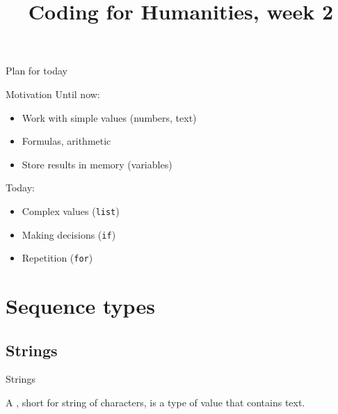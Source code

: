 \documentclass[aspectratio=169,usenames,dvipsnames]{beamer}
\title{Coding for Humanities, week 2}
\begin{document}
\begin{frame}
    \titlepage
\end{frame}

\begin{frame}{Plan for today}
    \tableofcontents
\end{frame}

\begin{frame}{Motivation}
    Until now:
    \begin{itemize}
        \item Work with simple values (numbers, text)
        \item Formulas, arithmetic
        \item Store results in memory (variables)
    \end{itemize}

    \pause
    Today:
    \begin{itemize}
        \item Complex values (\texttt{list})
        \item Making decisions (\texttt{if})
        \item Repetition (\texttt{for})
    \end{itemize}
\end{frame}

\section{Sequence types}
\subsection{Strings}
\frame{\tableofcontents[currentsection]}

\begin{frame}{Strings}
    \begin{definition}
        A , short for string of characters,
        is a type of value that contains text.
    \end{definition}

\end{frame}
\end{document}
